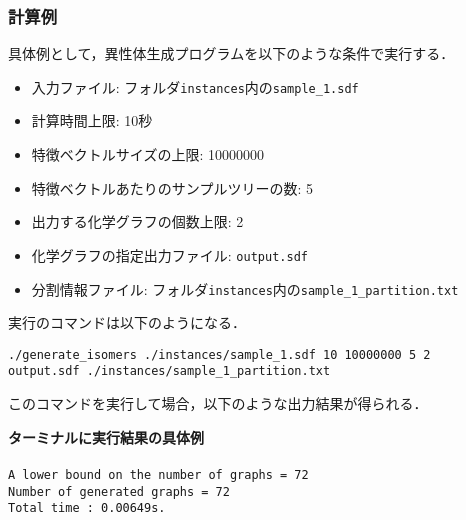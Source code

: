 \documentclass[11pt,titlepage,dvipdfmx,twoside]{jarticle}
\begin{document}
\subsubsection{計算例}
\label{sec:instance_g}

具体例として，異性体生成プログラムを以下のような条件で実行する．

\begin{itemize}
\item 入力ファイル: フォルダ{\tt instances}内の{\tt sample\_1.sdf}
\item 計算時間上限: 10秒
\item 特徴ベクトルサイズの上限: 10000000
\item 特徴ベクトルあたりのサンプルツリーの数: 5
\item 出力する化学グラフの個数上限: 2
\item 化学グラフの指定出力ファイル: {\tt output.sdf}
\item 分割情報ファイル: フォルダ{\tt instances}内の{\tt sample\_1\_partition.txt}
\end{itemize}

実行のコマンドは以下のようになる．

\bigskip


{\tt ./generate\_isomers ./instances/sample\_1.sdf 10 10000000 5 2} \\
 {\tt output.sdf ./instances/sample\_1\_partition.txt}	


\bigskip

このコマンドを実行して場合，以下のような出力結果が得られる．

\begin{oframed}
{\bf ターミナルに実行結果の具体例}\\\\
{\tt A lower bound on the number of graphs = 72\\
Number of generated graphs = 72\\
Total time : 0.00649s.}
\end{oframed}
\end{document}
